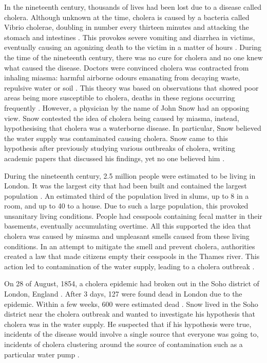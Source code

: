 \documentclass[12pt]{article}
\begin{document}
In the nineteenth century, thousands of lives had been lost due to a disease called cholera. Although unknown at the time, cholera is caused by a bacteria called Vibrio cholerae, doubling in number every thirteen minutes and attacking the stomach and intestines \cite{channel1}. This provokes severe vomiting and diarrhea in victims, eventually causing an agonizing death to the victim in a matter of hours \cite{heros, channel1}. During the time of the nineteenth century, there was no cure for cholera and no one knew what caused the disease. Doctors were convinced cholera was contracted from inhaling miasma: harmful airborne odours emanating from decaying waste, repulsive water or soil \cite{test}. This theory was based on observations that showed poor areas being more susceptible to cholera, deaths in these regions occurring frequently \cite{heros}. However, a physician by the name of John Snow had an opposing view. Snow contested the idea of cholera being caused by miasma, instead, hypothesising that cholera was a waterborne disease. In particular, Snow believed the water supply was contaminated causing cholera. Snow came to this hypothesis after previously studying various outbreaks of cholera, writing academic papers that discussed his findings, yet no one believed him \cite{original}. 

During the nineteenth century, 2.5 million people were estimated to be living in London. It was the largest city that had been built and contained the largest population \cite{channel1, tedtalk}. An estimated third of the population lived in slums, up to 8 in a room, and up to 40 to a house. Due to such a large population, this provoked unsanitary living conditions. People had cesspools containing fecal matter in their basements, eventually accumulating overtime. All this supported the idea that cholera was caused by miasma and unpleasant smells caused from these living conditions. In an attempt to mitigate the smell and prevent cholera, authorities created a law that made citizens empty their cesspools in the Thames river. This action led to contamination of the water supply, leading to a cholera outbreak \cite{tedtalk, johnson}. 

On 28 of August, 1854, a cholera epidemic had broken out in the Soho district of London, England \cite{tedtalk}. After 3 days, 127 were found dead in London due to the epidemic. Within a few weeks, 600 were estimated dead \cite{youtube, tedtalk}. Snow lived in the Soho district near the cholera outbreak and wanted to investigate his hypothesis that cholera was in the water supply. He suspected that if his hypothesis were true, incidents of the disease would involve a single source that everyone was going to, incidents of cholera clustering around the source of contamination such as a particular water pump \cite{test, tedtalk, johnson}. 
\end{document}
